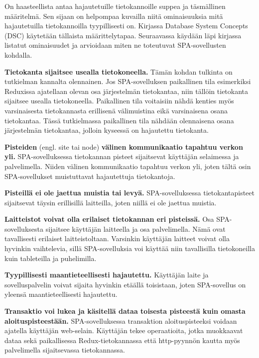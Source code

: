 \documentclass[finnish,twoside,censored,csm,sw-track-2018]{HYthesisML}
\begin{document}
On haasteellista antaa hajautetuille tietokannoille suppea ja täsmällinen määritelmä. Sen sijaan on helpompaa kuvailla niitä ominaisuuksia mitä hajautetuilla tietokannoilla tyypillisesti on. Kirjassa Database System Concepts (DSC) \citep{DSC} käytetään tällaista määrittelytapaa. Seuraavassa käydään läpi kirjassa listatut ominaisuudet ja arvioidaan miten ne toteutuvat SPA-sovellusten kohdalla.

\textbf{Tietokanta sijaitsee usealla tietokoneella.} Tämän kohdan tulkinta on tutkielman kannalta olennainen. Jos SPA-sovelluksen paikallinen tila esimerkiksi Reduxissa ajatellaan olevan osa järjestelmän tietokantaa, niin tällöin tietokanta sijaitsee usealla tietokoneella. Paikallinen tila voitaisiin nähdä kenties myös varsinaisesta tietokannasta erillisenä välimuistina eikä varsinaisena osana tietokantaa. Tässä tutkielmassa paikallinen tila nähdään olennaisena osana järjestelmän tietokantaa, jolloin kyseessä on hajautettu tietokanta.
    
\textbf{Pisteiden} (engl. site tai node) \textbf{välinen kommunikaatio tapahtuu verkon yli.} SPA-sovelluksessa tietokannan pisteet sijaitsevat käyttäjän selaimessa ja palvelimella. Niiden välinen kommunikaatio tapahtuu verkon yli, joten tältä osin SPA-sovellukset muistuttavat hajautettuja tietokantoja.

\textbf{Pisteillä ei ole jaettua muistia tai levyä.} SPA-sovelluksessa tietokantapisteet sijaitsevat täysin erillisillä laitteilla, joten niillä ei ole jaettua muistia.

\textbf{Laitteistot voivat olla erilaiset tietokannan eri pisteissä.} Osa SPA-sovelluksesta sijaitsee käyttäjän laitteella ja osa palvelimella. Nämä ovat tavallisesti erilaiset laitteistoltaan. Varsinkin käyttäjän laitteet voivat olla hyvinkin vaihtelevia, sillä SPA-sovelluksia voi käyttää niin tavallisilla tietokoneilla kuin tableteilla ja puhelimilla.
    
\textbf{Tyypillisesti maantieteellisesti hajautettu.} Käyttäjän laite ja sovelluspalvelin voivat sijaita hyvinkin etäällä toisistaan, joten SPA-sovellus on yleensä maantieteellisesti hajautettu.

\textbf{Transaktio voi lukea ja käsitellä dataa toisesta pisteestä kuin omasta aloituspisteestään.} SPA-sovelluksessa transaktion aloituspisteeksi voidaan ajatella käyttäjän web-selain. Käyttäjän tekee operaatioita, jotka muokkaavat dataa sekä paikallisessa Redux-tietokannassa että http-pyynnön kautta myös palvelimella sijaitsevassa tietokannassa.
\end{document}
